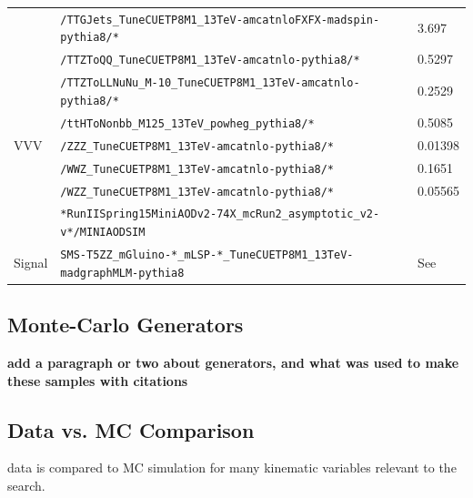 \begin{table}
\begin{center}
\begin{tabular}{l|l|l}
            & \verb=/TTGJets_TuneCUETP8M1_13TeV-amcatnloFXFX-madspin-pythia8/*=           & 3.697        \\
            & \verb=/TTZToQQ_TuneCUETP8M1_13TeV-amcatnlo-pythia8/*=                       & 0.5297       \\
            & \verb=/TTZToLLNuNu_M-10_TuneCUETP8M1_13TeV-amcatnlo-pythia8/*=              & 0.2529       \\
            & \verb=/ttHToNonbb_M125_13TeV_powheg_pythia8/*=                              & 0.5085       \\
\hline
VVV         & \verb=/ZZZ_TuneCUETP8M1_13TeV-amcatnlo-pythia8/*=                           & 0.01398      \\
            & \verb=/WWZ_TuneCUETP8M1_13TeV-amcatnlo-pythia8/*=                           & 0.1651       \\
            & \verb=/WZZ_TuneCUETP8M1_13TeV-amcatnlo-pythia8/*=                           & 0.05565      \\
\hline
            & \verb=*RunIISpring15MiniAODv2-74X_mcRun2_asymptotic_v2-v*/MINIAODSIM=       &              \\
\hline
Signal      & \verb=SMS-T5ZZ_mGluino-*_mLSP-*_TuneCUETP8M1_13TeV-madgraphMLM-pythia8=     & See~\cite{gluinoxsec13tev} \\
\hline
\hline
\end{tabular}
\end{center}
\end{table}

\clearpage

\subsection{Monte-Carlo Generators}
{\bf add a paragraph or two about generators, and what was used to make these samples with citations}

\subsection{Data vs. MC Comparison}
\label{ssec:datavsmc}
data is compared to MC simulation for many kinematic variables relevant to the search.


